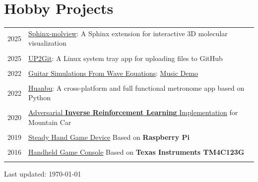 \documentclass[a4paper,10pt]{article} %
\begin{document}
\section{Hobby Projects}
\begin{tabular}{r|l}
	2025 &
\href{https://github.com/HuangJiaLian/sphinx-molview}{Sphinx-molview}: A Sphinx extension for interactive 3D molecular visualization\\
\multicolumn{1}{c}{} \\	

	2025 &
\href{https://github.com/HuangJiaLian/Up2Git}{UP2Git}: A Linux system tray app for uploading files to GitHub\\
\multicolumn{1}{c}{} \\	
	
	2022 &
\href{https://github.com/HuangJiaLian/Guitar_Simulations}{Guitar Simulations From Wave Equations}: \href{https://way2ml.github.io/_static/cv/2022_10_02_14_7_11_Happy_Birthday_To_Ya.mp3}{Music Demo}\\
\multicolumn{2}{c}{} \\	%

	2022 &
\href{https://github.com/HuangJiaLian/HuanBu_Metronome}{Huanbu}: A cross-platform and full functional metronome app based on Python\\
\multicolumn{2}{c}{} \\	%
	
    
	2020						&
	\href{https://github.com/HuangJiaLian/AIRL_MountainCar}{Adversarial \textbf{Inverse Reinforcement Learning} Implementation} for Mountain Car \\
	\multicolumn{2}{c}{} \\	%
	
	2019						&
	\href{https://way2ml.github.io/_static/cv/2021_12_16_21_SteadyHand.jpeg}{Steady Hand Game Device} Based on \textbf{Raspberry Pi}\\	
	\multicolumn{2}{c}{} \\	%
	
	2016                        & \href{https://way2ml.github.io/_static/cv/2021_12_16_21_Game_Boy.pdf}{Handheld Game Console} Based on \textbf{Texas Instruments TM4C123G}\\
	\multicolumn{2}{c}{} \\	%
\end{tabular}
\begin{flushright} 
Last updated: {\today}
\end{flushright}
\end{document}
